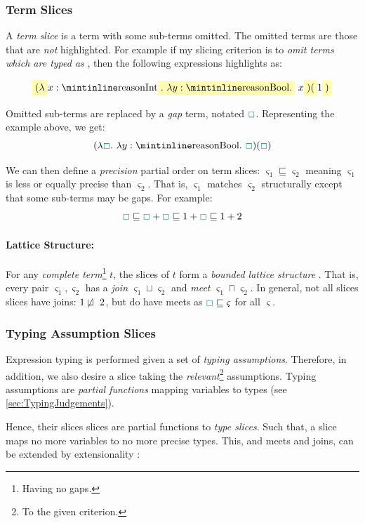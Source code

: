 \subsubsection{Term Slices}
A \textit{term slice} is a term with some sub-terms omitted. The omitted terms are those that are \textit{not} highlighted. For example if my slicing criterion is to \textit{omit terms which are typed as} , then the following expressions highlights as:

\[\hlcmaths[yellow!30]{(\lambda} x: \code{Int}\hlcmaths[yellow!30]{.\ \lambda y : \code{Bool}.}\ x\hlcmaths[yellow!30]{)(}1\hlcmaths[yellow!30]{)}\]


Omitted sub-terms are replaced by a \textit{gap} term, notated ${\color{teal}\Box}$. Representing the example above, we get:
\[(\lambda \gap.\ \lambda y : \code{Bool}.\ \gap)(\gap)\]

We can then define a \textit{precision} partial order \cite{PartialOrder} on term slices: $\varsigma_1 \sqsubseteq \varsigma_2$ meaning $\varsigma_1$ is less or equally precise than $\varsigma_2$. That is, $\varsigma_1$ matches $\varsigma_2$ structurally except that some sub-terms may be gaps. For example:
\[{\color{teal}\Box} \sqsubseteq{\color{teal}\Box} + {\color{teal}\Box}\sqsubseteq 1 + {\color{teal}\Box} \sqsubseteq 1 + 2\]

\paragraph{Lattice Structure:}\label{sec:JoinTypesTheory} For any \textit{complete term}\footnote{Having no gaps.} $t$, the slices of $t$ form a \textit{bounded lattice structure} \cite{Lattice}. That is, every pair $\varsigma_1, \varsigma_2$ has a \textit{join} $\varsigma_1 \sqcup \varsigma_2$ and \textit{meet} $\varsigma_1 \sqcap \varsigma_2$. In general, not all slices slices have joins: $1 \centernot\sqcup\ 2$, but do have meets as ${\color{teal}\Box} \sqsubseteq \varsigma$ for all $\varsigma$.
 
\subsubsection{Typing Assumption Slices}
Expression typing is performed given a set of \textit{typing assumptions}. Therefore, in addition, we also desire a slice taking the \textit{relevant}\footnote{To the given criterion.} assumptions. Typing assumptions are \textit{partial functions} mapping variables to types (see \cref{sec:TypingJudgements}). 

Hence, their slices slices are partial functions to \textit{type slices}. Such that, a slice maps no more variables to no more precise types. This, and meets and joins, can be extended by extensionality \cite{Extensionality}:

